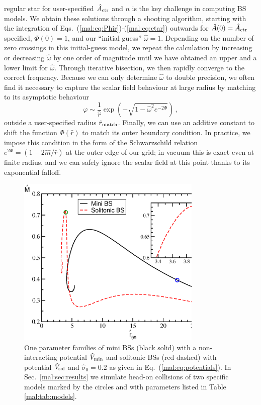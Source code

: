 regular star for user-specified $\hat{A}_{\rm ctr}$ and $n$ is
the key challenge in computing BS models. We obtain
these solutions through a shooting algorithm, starting with
the integration of
Eqs.~(\ref{mal:eq:Phir})-(\ref{mal:eq:etar}) outwards for
$\hat{A}(0)=\hat{A}_{\rm ctr}$ specified, $\Phi(0)=1$, and our
``initial guess'' $\hat{\omega}=1$. Depending on the number
of zero crossings in this initial-guess model, we repeat
the calculation by increasing or decreasing $\hat{\omega}$
by one order of magnitude until we have obtained an upper and
a lower limit for $\hat{\omega}$. Through iterative bisection,
we then rapidly converge to the correct frequency. Because
we can only determine $\hat{\omega}$ to double precision,
we often find it necessary to capture the scalar field
behaviour at large radius by matching to its asymptotic behaviour
%
\begin{equation}
  \varphi \sim \frac{1}{\hat{r}}
  \exp\left( {-\sqrt{1-\hat{\omega}^2e^{-2\Phi}}}\right)\,,
\end{equation}
%
outside a user-specified radius $\hat{r}_{\rm match}$. Finally,
we can use an additive constant to shift the function $\Phi(\hat{r})$
to match its outer boundary condition. In practice, we impose
this condition in the form of the Schwarzschild relation
$e^{2\Phi}=(1-2\hat{m}/\hat{r})$ at the outer edge of our
grid; in vacuum this is exact even
at finite radius, and we can safely ignore the scalar field
at this point thanks to its exponential falloff.
%
\begin{figure}[b]
    \centering
    \includegraphics[width=250pt]{malaise_source/statBS.eps}
    \caption{One parameter families of mini BSs (black solid) with a
    non-interacting potential $\hat{V}_{\rm min}$ and solitonic BSs (red dashed) with
    potential $\hat{V}_{\rm sol}$ and $\hat{\sigma}_0=0.2$
    as given in Eq.~(\ref{mal:eq:potentials}). In Sec.~\ref{mal:sec:results}
    we simulate head-on collisions of two specific models
    marked by the circles and with parameters listed in
    Table \ref{mal:tab:models}.
    }
    \label{mal:fig:statBS}
\end{figure}
%

